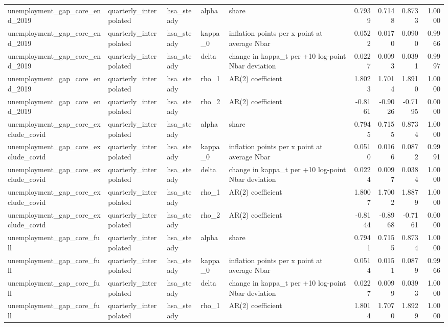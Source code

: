 \begin{tabular}{lllllrrrr}
unemployment\_gap\_core\_end\_2019 & quarterly\_interpolated & hsa\_steady & alpha & share & 0.7939 & 0.7148 & 0.8733 & 1.0000 \\
unemployment\_gap\_core\_end\_2019 & quarterly\_interpolated & hsa\_steady & kappa\_0 & inflation points per x point at average Nbar & 0.0522 & 0.0170 & 0.0900 & 0.9966 \\
unemployment\_gap\_core\_end\_2019 & quarterly\_interpolated & hsa\_steady & delta & change in kappa\_t per +10 log-point Nbar deviation & 0.0227 & 0.0093 & 0.0391 & 0.9997 \\
unemployment\_gap\_core\_end\_2019 & quarterly\_interpolated & hsa\_steady & rho\_1 & AR(2) coefficient & 1.8023 & 1.7014 & 1.8910 & 1.0000 \\
unemployment\_gap\_core\_end\_2019 & quarterly\_interpolated & hsa\_steady & rho\_2 & AR(2) coefficient & -0.8161 & -0.9026 & -0.7195 & 0.0000 \\
unemployment\_gap\_core\_exclude\_covid & quarterly\_interpolated & hsa\_steady & alpha & share & 0.7945 & 0.7155 & 0.8734 & 1.0000 \\
unemployment\_gap\_core\_exclude\_covid & quarterly\_interpolated & hsa\_steady & kappa\_0 & inflation points per x point at average Nbar & 0.0510 & 0.0166 & 0.0872 & 0.9991 \\
unemployment\_gap\_core\_exclude\_covid & quarterly\_interpolated & hsa\_steady & delta & change in kappa\_t per +10 log-point Nbar deviation & 0.0224 & 0.0097 & 0.0384 & 1.0000 \\
unemployment\_gap\_core\_exclude\_covid & quarterly\_interpolated & hsa\_steady & rho\_1 & AR(2) coefficient & 1.8007 & 1.7002 & 1.8879 & 1.0000 \\
unemployment\_gap\_core\_exclude\_covid & quarterly\_interpolated & hsa\_steady & rho\_2 & AR(2) coefficient & -0.8144 & -0.8968 & -0.7161 & 0.0000 \\
unemployment\_gap\_core\_full & quarterly\_interpolated & hsa\_steady & alpha & share & 0.7941 & 0.7155 & 0.8734 & 1.0000 \\
unemployment\_gap\_core\_full & quarterly\_interpolated & hsa\_steady & kappa\_0 & inflation points per x point at average Nbar & 0.0514 & 0.0151 & 0.0879 & 0.9966 \\
unemployment\_gap\_core\_full & quarterly\_interpolated & hsa\_steady & delta & change in kappa\_t per +10 log-point Nbar deviation & 0.0227 & 0.0099 & 0.0393 & 1.0000 \\
unemployment\_gap\_core\_full & quarterly\_interpolated & hsa\_steady & rho\_1 & AR(2) coefficient & 1.8014 & 1.7070 & 1.8929 & 1.0000 \\

\end{tabular}
